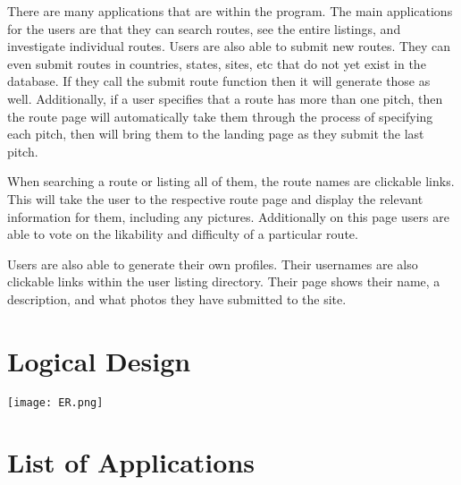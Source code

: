 \documentclass[12pt,letter]{article}
\begin{document}
There are many applications that are within the program. The main applications
for the users are that they can search routes, see the entire listings, and
investigate individual routes. Users are also able to submit new routes. They
can even submit routes in countries, states, sites, etc that do not yet exist in
the database. If they call the submit route function then it will generate those
as well. Additionally, if a user specifies that a route has more than one pitch,
then the route page will automatically take them through the process of
specifying each pitch, then will bring them to the landing page as they submit
the last pitch. 

When searching a route or listing all of them, the route names are clickable
links. This will take the user to the respective route page and display the
relevant information for them, including any pictures. Additionally on this page
users are able to vote on the likability and difficulty of a particular route.

Users are also able to generate their own profiles. Their usernames are also
clickable links within the user listing directory. Their page shows their name,
a description, and what photos they have submitted to the site. 

\section{Logical Design}\label{sec:ld}
\texttt{[image: ER.png]}

\section{List of Applications}\label{sec:apps}
\end{document}
